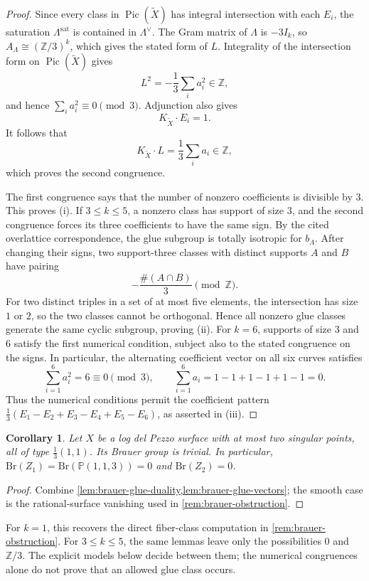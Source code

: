 \documentclass[11pt]{article}
\theoremstyle{plain}
\newtheorem{corollary}[corollary]{Corollary}
\theoremstyle{definition}
\theoremstyle{remark}
\newcommand{\Pp}{\mathbb P}
\newcommand{\Z}{\mathbb Z}
\newcommand{\Pic}{\operatorname{Pic}}
\newcommand{\Br}{\mathrm{Br}}
\begin{document}
\begin{proof}
Since every class in \(\Pic(\widetilde X)\) has integral intersection with
each \(E_i\), the saturation \(\Lambda^{\mathrm{sat}}\) is contained in
\(\Lambda^\vee\). The Gram matrix of \(\Lambda\) is \(-3I_k\), so
\(A_\Lambda\cong(\Z/3)^k\), which gives the stated form of \(L\).
Integrality of the intersection form on \(\Pic(\widetilde X)\) gives
\[
L^2=-\frac13\sum_i a_i^2\in\Z,
\]
and hence \(\sum_i a_i^2\equiv0\pmod3\). Adjunction also gives
\[
K_{\widetilde X}\cdot E_i=1.
\]
It follows that
\[
K_{\widetilde X}\cdot L=\frac13\sum_i a_i\in\Z,
\]
which proves the second congruence.

The first congruence says that the number of nonzero coefficients is divisible
by \(3\). This proves (i). If \(3\leq k\leq5\), a nonzero class has support
of size \(3\), and the second congruence forces its three coefficients to
have the same sign. By the cited overlattice correspondence, the glue subgroup
is totally isotropic for \(b_\Lambda\). After changing their signs,
two support-three classes with distinct supports \(A\) and \(B\)
have pairing
\[
-\frac{\#(A\cap B)}{3}\pmod{\Z}.
\]
For two distinct triples in a set of at most five elements, the intersection
has size \(1\) or \(2\), so the two classes cannot be orthogonal. Hence all
nonzero glue classes generate the same cyclic subgroup, proving (ii). For
\(k=6\), supports of size \(3\) and \(6\) satisfy the first numerical
condition, subject also to the stated congruence on the signs. In particular,
the alternating coefficient vector on all six curves satisfies
\[
\sum_{i=1}^6 a_i^2=6\equiv0\pmod3,
\qquad
\sum_{i=1}^6 a_i=1-1+1-1+1-1=0.
\]
Thus the numerical conditions permit the coefficient pattern
\(\frac13(E_1-E_2+E_3-E_4+E_5-E_6)\), as asserted in (iii).
\end{proof}

\begin{corollary}\label{cor:brauer-one-two}
Let \(X\) be a log del Pezzo surface with at most two singular points,
all of type \(\frac13(1,1)\). Its Brauer group is trivial. In particular,
\(\Br(Z_1)=\Br(\Pp(1,1,3))=0\) and \(\Br(Z_2)=0\).
\end{corollary}

\begin{proof}
Combine \cref{lem:brauer-glue-duality,lem:brauer-glue-vectors}; the
smooth case is the rational-surface vanishing used in
\cref{rem:brauer-obstruction}.
\end{proof}

For \(k=1\), this recovers the direct fiber-class computation in
\cref{rem:brauer-obstruction}. For \(3\leq k\leq5\), the same lemmas
leave only the possibilities \(0\) and \(\Z/3\). The explicit models
below decide between them; the numerical congruences alone do not prove
that an allowed glue class occurs.
\end{document}
